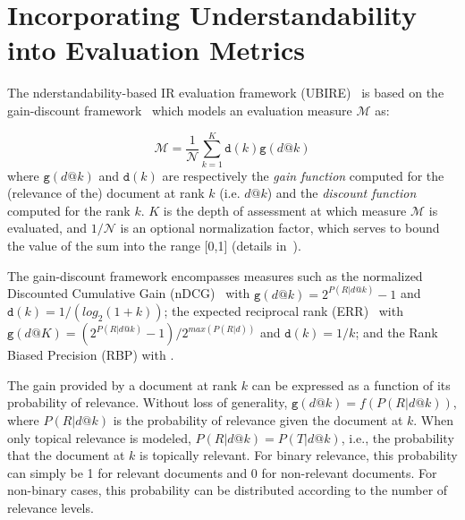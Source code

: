 \section{Incorporating Understandability into Evaluation Metrics}
\label{sec:understandability_metrics}
The nderstandability-based IR evaluation framework (UBIRE)~\cite{zuccon14,zuccon16} is based on the gain-discount framework~\cite{carterette11} which models an evaluation measure $\mathcal{M}$ as:




%
\begin{equation}
\mathcal{M} = \frac{1}{\mathcal{N}} \sum_{k=1}^{K} \mathtt{d}(k) \mathtt{g}(d@k)
\end{equation}
%
where $\mathtt{g}(d@k)$ and $\mathtt{d}(k)$ are respectively the \textit{gain function} computed for the (relevance of the) document at rank $k$ (i.e. $d@k$) and the \textit{discount function} computed for the rank $k$.
$K$ is the depth of assessment at which measure $\mathcal{M}$ is evaluated, and $1/\mathcal{N}$ is an optional normalization factor, which serves to bound the value of the sum into the range [0,1] (details in~\cite{carterette11}).

The gain-discount framework encompasses measures such as the normalized Discounted Cumulative Gain (nDCG)~\cite{jarvelin02} with $\mathtt{g}(d@k) = 2^{P(R|d@k)} - 1$ and $\mathtt{d}(k) = 1/(log_2(1 + k))$; the expected reciprocal rank (ERR)~\cite{chapelle09} with $\mathtt{g}(d@K) =  (2^{P (R|d@k)} - 1)/2^{max(P (R|d))}$ and $\mathtt{d}(k) = 1/k$; and the Rank Biased Precision (RBP) with .

The gain provided by a document at rank $k$ can be expressed as a function of its probability of relevance. Without loss of generality, $\mathtt{g}(d@k) = f(P(R|d@k))$, where $P(R|d@k)$ is the probability of relevance given the document at $k$. 
When only topical relevance is modeled, $P(R|d@k) = P(T|d@k)$, i.e., the probability that the document at $k$ is topically relevant. 
For binary relevance, this probability can simply be 1 for relevant documents and 0 for non-relevant documents. For non-binary cases, this probability can be distributed according to the number of relevance levels.

